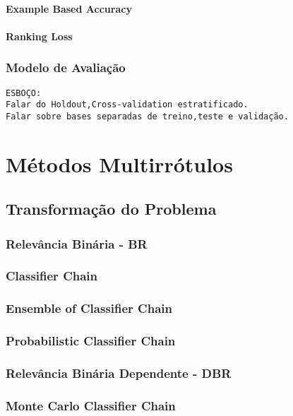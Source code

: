 \subsubsection{Example Based Accuracy}
\subsubsection{Ranking Loss}
\subsection{Modelo de Avaliação}
\label{sec:modelav}

\begin{verbatim}
ESBOÇO:
Falar do Holdout,Cross-validation estratificado.
Falar sobre bases separadas de treino,teste e validação.
\end{verbatim}

\chapter{Métodos Multirrótulos}
\section{Transformação do Problema}
\subsection{Relevância Binária - BR}
\label{sec:br}
\subsection{Classifier Chain}
\subsection{Ensemble of Classifier Chain}
\subsection{Probabilistic Classifier Chain}
\subsection{Relevância Binária Dependente - DBR}
\label{sec:dbr}
\subsection{Monte Carlo Classifier Chain}

